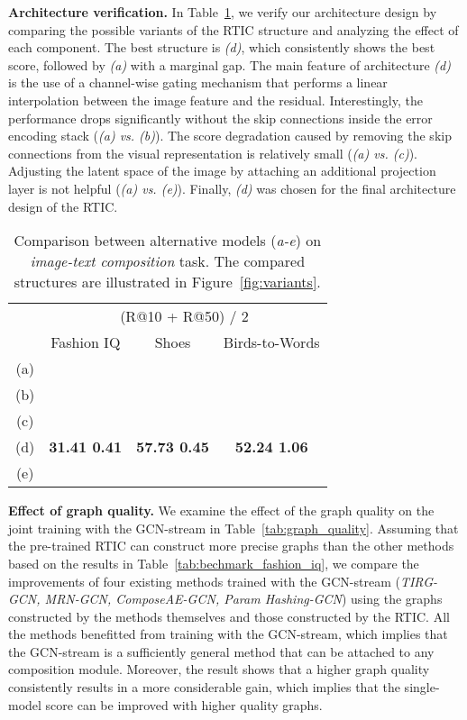\documentclass[10pt,twocolumn,letterpaper]{article}
\begin{document}
        
\noindent
\textbf{Architecture verification.} In Table~\ref{tab:structure_analysis}, we verify our architecture design by comparing the possible variants of the RTIC structure and analyzing the effect of each component. The best structure is \textit{(d)}, which consistently shows the best score, followed by \textit{(a)} with a marginal gap. The main feature of architecture \textit{(d)} is the use of a channel-wise gating mechanism that performs a linear interpolation between the image feature and the residual. Interestingly, the performance drops significantly without the skip connections inside the error encoding stack (\textit{(a) vs. (b)}). The score degradation caused by removing the skip connections from the visual representation is relatively small (\textit{(a) vs. (c)}). Adjusting the latent space of the image by attaching an additional projection layer is not helpful (\textit{(a) vs. (e)}). Finally, \textit{(d)} was chosen for the final architecture design of the RTIC.

\begin{table}[h]
    \caption{Comparison between alternative models (\textit{a-e}) on \textit{image-text composition} task. The compared structures are illustrated in Figure~\ref{fig:variants}.}
    \centering
    \begin{adjustbox}{width=0.40\textwidth}
    \begin{tabular}{cccc}
        \toprule
              & \multicolumn{3}{c}{(R@10 + R@50) / 2} \\ \cline{2-4} 
              & Fashion IQ   & Shoes   & Birds-to-Words   \\ \hline \hline
        (a)   &  &  &  \\
        (b)   &  &  &  \\
        (c)   &  &  &  \\
        (d)   & \textbf{31.41  0.41} & \textbf{57.73  0.45} & \textbf{52.24  1.06} \\
        (e)   &  &  &  \\
        \bottomrule
    \end{tabular}
    \end{adjustbox}
    \label{tab:structure_analysis}
    \end{table}
    

\noindent
\textbf{Effect of graph quality.} We examine the effect of the graph quality on the joint training with the GCN-stream in Table~\ref{tab:graph_quality}. Assuming that the pre-trained RTIC can construct more precise graphs than the other methods based on the results in Table~\ref{tab:bechmark_fashion_iq}, we compare the improvements of four existing methods trained with the GCN-stream (\textit{TIRG-GCN, MRN-GCN, ComposeAE-GCN, Param Hashing-GCN}) using the graphs constructed by the methods themselves and those constructed by the RTIC. All the methods benefitted from training with the GCN-stream, which implies that the GCN-stream is a sufficiently general method that can be attached to any composition module. Moreover, the result shows that a higher graph quality consistently results in a more considerable gain, which implies that the single-model score can be improved with higher quality graphs.
\end{document}
